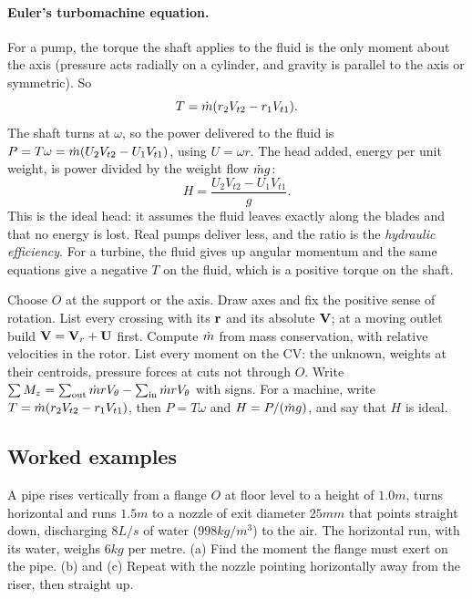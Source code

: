 \paragraph{Euler's turbomachine equation.} For a pump, the torque the shaft applies to the fluid is the only moment about the axis (pressure acts radially on a cylinder, and gravity is parallel to the axis or symmetric). So
\[
T = \dot m(r_2V_{t2} - r_1V_{t1}) .
\]
The shaft turns at $\omega$, so the power delivered to the fluid is $P = T\omega = \dot m(U_2V_{t2} - U_1V_{t1})$, using $U = \omega r$. The head added, energy per unit weight, is power divided by the weight flow $\dot m g$:
\[
H = \frac{U_2V_{t2} - U_1V_{t1}}{g} .
\]
This is the ideal head: it assumes the fluid leaves exactly along the blades and that no energy is lost. Real pumps deliver less, and the ratio is the \emph{hydraulic efficiency}. For a turbine, the fluid gives up angular momentum and the same equations give a negative $T$ on the fluid, which is a positive torque on the shaft.

\begin{firstmoves}
Choose $O$ at the support or the axis. Draw axes and fix the positive sense of rotation. List every crossing with its $\mathbf{r}$ and its absolute $\mathbf{V}$; at a moving outlet build $\mathbf{V} = \mathbf{V}_r + \mathbf{U}$ first. Compute $\dot m$ from mass conservation, with relative velocities in the rotor. List every moment on the CV: the unknown, weights at their centroids, pressure forces at cuts not through $O$. Write $\sum M_z = \sum_\text{out}\dot m rV_\theta - \sum_\text{in}\dot m rV_\theta$ with signs. For a machine, write $T = \dot m(r_2V_{t2} - r_1V_{t1})$, then $P = T\omega$ and $H = P/(\dot m g)$, and say that $H$ is ideal.
\end{firstmoves}

\subsection*{Worked examples}

\begin{example}
A pipe rises vertically from a flange $O$ at floor level to a height of $1.0\unit{m}$, turns horizontal and runs $1.5\unit{m}$ to a nozzle of exit diameter $25\unit{mm}$ that points straight down, discharging $8\unit{L/s}$ of water ($998\unit{kg/m^3}$) to the air. The horizontal run, with its water, weighs $6\unit{kg}$ per metre. (a) Find the moment the flange must exert on the pipe. (b) and (c) Repeat with the nozzle pointing horizontally away from the riser, then straight up.
\end{example}

